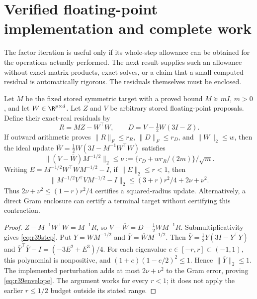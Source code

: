 \section{Verified floating-point implementation and complete work}
\label{sec:r39floating}

The factor iteration is useful only if its whole-step allowance can be
obtained for the operations actually performed. The next result supplies such
an allowance without exact matrix products, exact solves, or a claim that a
small computed residual is automatically rigorous. The residuals themselves
must be enclosed.

\begin{proposition}
\label{prop:r39floating}
Let $M$ be the fixed stored symmetric target with a proved bound $M\succeq mI$,
$m>0$, and let $W\in\R^{p\times d}$. Let $Z$ and $V$ be arbitrary stored
floating-point proposals. Define their exact-real residuals by
\[
 R=MZ-W^\top W,\qquad D=V-\tfrac12W(3I-Z).
\]
If outward arithmetic proves $\|R\|_F\leq r_R$, $\|D\|_F\leq r_D$, and
$\|W\|_2\leq w$, then the ideal update
$\overline W=\tfrac12W(3I-M^{-1}W^\top W)$ satisfies
\begin{equation}\label{eq:r39step}
 \|(V-\overline W)M^{-1/2}\|_2
 \leq \nu:=\{r_D+wr_R/(2m)\}/\sqrt m.
\end{equation}
Writing $E=M^{-1/2}W^\top WM^{-1/2}-I$, if $\|E\|_2\leq r<1$, then
\begin{equation}\label{eq:r39envelope}
 \|M^{-1/2}V^\top VM^{-1/2}-I\|_2
 \leq (3+r)r^2/4+2\nu+\nu^2.
\end{equation}
Thus $2\nu+\nu^2\leq(1-r)r^2/4$ certifies a squared-radius update.
Alternatively, a direct Gram enclosure can certify a terminal target without
certifying this contraction.
\end{proposition}
\begin{proof}
$Z-M^{-1}W^\top W=M^{-1}R$, so
$V-\overline W=D-\tfrac12WM^{-1}R$. Submultiplicativity gives
\eqref{eq:r39step}. Put $Y=WM^{-1/2}$ and $\overline Y=\overline WM^{-1/2}$.
Then $\overline Y=\tfrac12Y(3I-Y^\top Y)$ and
$\overline Y^\top\overline Y-I=(-3E^2+E^3)/4$.
For each eigenvalue $e\in[-r,r]\subset(-1,1)$, this polynomial is nonpositive,
and $(1+e)(1-e/2)^2\leq1$. Hence $\|\overline Y\|_2\leq1$.
The implemented perturbation adds at most $2\nu+\nu^2$ to the Gram error,
proving \eqref{eq:r39envelope}. The argument works for every $r<1$; it does
not apply the earlier $r\leq1/2$ budget outside its stated range.
\end{proof}

